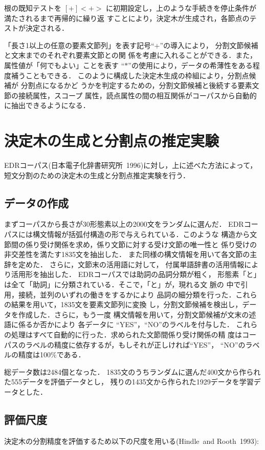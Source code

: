 根の既知テストを 
$[+]<+>$
に初期設定し，上のような手続きを停止条件が満たされるまで再帰的に繰り返
すことにより，決定木が生成され，各節点のテストが決定される．

「長さ1以上の任意の要素文節列」を表す記号“$+$”の導入により，
分割文節候補と文末までのそれぞれ要素文節との関
係を考慮に入れることができる．また，属性値が「何でもよい」ことを表す
“$*$”の使用により，データの希薄性をある程度補うこともできる．
このように構成した決定木生成の枠組により，分割点候補が
分割点になるかど
うかを判定するための，分割文節候補と後続する要素文節の接続属性，スコープ
属性，読点属性の間の相互関係がコーパスから自動的に抽出できるようになる．
\section{決定木の生成と分割点の推定実験}
EDRコーパス(日本電子化辞書研究所\ 1996)に対し，上に述べた方法によって，
短文分割のための決定木の生成と分割点推定実験を行う．
\subsection{データの作成}
まずコーパスから長さが30形態素以上の2000文をランダムに選んだ．
EDRコーパスには構文情報が括弧付構造の形で与えられている．このような
構造から文節間の係り受け関係を求め，係り文節に対する受け文節の唯一性と
係り受けの非交差性を満たす1835文を抽出した．
また同様の構文情報を用いて各文節の主辞を定めた．
さらに，文節末の活用語に対して，
付属単語辞書の活用情報により活用形を抽出した．
EDRコーパスでは助詞の品詞分類が粗く，
形態素「と」は全て「助詞」に分類されている．そこで，「と」が，現れる文
脈の
中で引用，接続，並列のいずれの働きをするかにより
品詞の細分類を行った．これらの結果を用いて，1835文を要素文節列に変換
し，分割文節候補を検出し，データを作成した．さらに，もう一度
構文情報を用いて，分割文節候補が文末の述語に係るか否かにより
各データに “YES”，“NO”のラベルを付与した．
これらの処理はすべて自動的に行った．求められた文節間係り受け関係の精
度はコーパスのラベルの精度に依存するが，もしそれが正しければ“YES”，
“NO”のラベルの精度は100\%である．

総データ数は2484個となった．
1835文のうちランダムに選んだ400文から作られた555データを評価データとし，
残りの1435文から作られた1929データを学習データとした．
\subsection{評価尺度}
決定木の分割精度を評価するため以下の尺度を用いる(Hindle\ and Rooth\ 1993):

